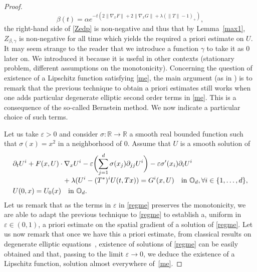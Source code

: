 \documentclass[10pt]{amsart}
\let\epsilon\varepsilon
\theoremstyle{definition}
\begin{document}
\begin{proof}
\begin{equation*}
\beta(t) = \alpha e^{-t(2\|\nabla_x F\|+2 \|\nabla_x G\|+\lambda(\|T\| -1)_+)},
\end{equation*}
the right-hand side of \eqref{Zedp} is non-negative and thus that by Lemma~\ref{max1}, $Z_{\beta,\gamma}$ is non-negative for all time which yields the required a priori estimate on $U$. It may seem strange to the reader that we introduce a function $\gamma$ to take it as $0$ later on. We introduced it because it is useful in other contexts (stationary problem, different assumptions on the monotonicity).
Concerning the question of existence of a Lipschitz function satisfying \eqref{me}, the main argument (as in \cite{lions2007cours}) is to remark that the previous technique to obtain a priori estimates still works when one adds particular degenerate elliptic second order terms in \eqref{me}. This is a consequence of the so-called Bernstein method. We now indicate a particular choice of such terms.

Let us take $\epsilon > 0$ and consider $\sigma: \mathbb{R} \to \mathbb{R}$ a smooth real bounded function such that $\sigma (x) = x^2$ in a neighborhood of $0$. Assume that $U$ is a smooth solution of
\begin{equation}\label{regme}
\begin{split}
&\partial_t U^i+F(x,U) \cdot \nabla_x U^i-\epsilon \biggl(\sum_{j=1}^d \sigma(x_j)\partial_{jj}U^i\biggr)-\epsilon \sigma'(x_i)\partial_i U^i\\[-3pt]
&\hspace*{2.5cm}+\lambda (U^i-(T^*)^iU(t,Tx)) = G^i(x,U) \quad\text{in } \mathbb{O}_d, \forall i \in \{1,\dots,d\},\\
&U(0,x) = U_0(x)  \quad\text{in } \mathbb{O}_d.
\end{split}
\end{equation}
Let us remark that as the terms in $\epsilon$ in \eqref{regme} preserves the monotonicity, we are able to adapt the previous technique to \eqref{regme} to establish a, uniform in $\epsilon \in (0,1)$, a priori estimate on the spatial gradient of a solution of \eqref{regme}. Let us now remark that once we have this a priori estimate, from classical results on degenerate elliptic equations~\cite{oleinik2012second}, existence of solutions of \eqref{regme} can be easily obtained and that, passing to the limit $\epsilon \to 0$, we deduce the existence of a Lipschitz function, solution almost everywhere of~\eqref{me}.
\end{proof}
\end{document}
